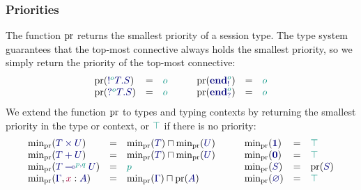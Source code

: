 \documentclass[main.tex]{subfiles}
\begin{document}
\subsubsection*{Priorities}
The function $\operatorname{pr}$ returns the smallest priority of a session type. The type system guarantees that the top-most connective always holds the smallest priority, so we simply return the priority of the top-most connective:
\[
\begin{array}{lcl}
  \pr(\ty{\tysend[\cs{o}]{T}{S}})            & = & \cs{o} \\
  \pr(\ty{\tyrecv[\cs{o}]{T}{S}})            & = & \cs{o} \\
\end{array}
\qquad
\begin{array}{lcl}
  \pr(\ty{\tyends[\cs{o}]})                  & = & \cs{o} \\
  \pr(\ty{\tyendr[\cs{o}]})                  & = & \cs{o} \\
\end{array}
\]
We extend the function $\operatorname{pr}$ to types and typing contexts by returning the smallest priority in the type or context, or $\cs{\top}$ if there is no priority:
\[
\begin{array}{lcl}
  \minpr(\ty{\typrod{T}{U}})                 & = & \minpr({\ty{T}})\sqcap\minpr({\ty{U}}) \\
  \minpr(\ty{\tysum{T}{U}})                  & = & \minpr({\ty{T}})\sqcap\minpr({\ty{U}}) \\
  \minpr(\ty{\tylolli[\cs{p},\cs{q}]{T}{U}}) & = & \cs{p} \\
  \minpr(\ty{\Gamma}, \tmty{x}{A})           & = & \minpr(\ty{\Gamma})\sqcap\pr(\ty{A})
\end{array}
\qquad
\begin{array}{lcl}
  \minpr(\ty{\tyunit})                       & = & \ptop \\
  \minpr(\ty{\tyvoid})                       & = & \ptop \\
  \minpr(\ty{S})                             & = & \pr(\ty{S}) \\
  \minpr(\ty{\emptyenv})                     & = & \ptop
\end{array}
\]
\end{document}
